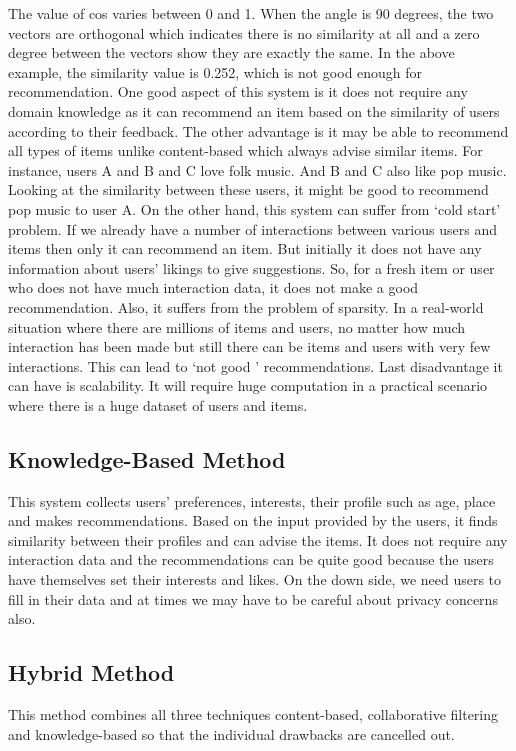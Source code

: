 \documentclass{jot}
\begin{document}
The value of cos varies between 0 and 1. When the angle is 90 degrees, the two vectors are orthogonal which indicates there is no similarity at all and a zero degree between the vectors show they are exactly the same. In the above example, the similarity value is 0.252, which is not good enough for recommendation.
One good aspect of this system is it does not require any domain knowledge as it can recommend an item based on the similarity of users according to their feedback. The other advantage is it may be able to recommend all types of items unlike content-based which always advise similar items. For instance, users A and B and C love folk music. And B and C also like pop music. Looking at the similarity between these users, it might be good to recommend pop music to user A. On the other hand, this system can suffer from ‘cold start’ problem. If we already have a number of interactions between various users and items then only it can recommend an item. But initially it does not have any information about users’ likings to give suggestions. So, for a fresh item or user who does not have much interaction data, it does not make a good recommendation. Also, it suffers from the problem of sparsity. In a real-world situation where there are millions of items and users, no matter how much interaction has been made but still there can be items and users with very few interactions. This can lead to ‘not good ’ recommendations. Last disadvantage it can have is scalability. It will require huge computation in a practical scenario where there is a huge dataset of users and items.


\subsection{Knowledge-Based Method}
This system collects users’ preferences, interests, their profile such as age, place and makes recommendations. Based on the input provided by the users, it finds similarity between their profiles and can advise the items.
It does not require any interaction data and the recommendations can be quite good because the users have themselves set their interests and likes. On the down side, we need users to fill in their data and at times we may have to be careful about privacy concerns also.


\subsection{Hybrid Method}
This method combines all three techniques content-based, collaborative filtering and knowledge-based so that the individual drawbacks are cancelled out.
\end{document}
